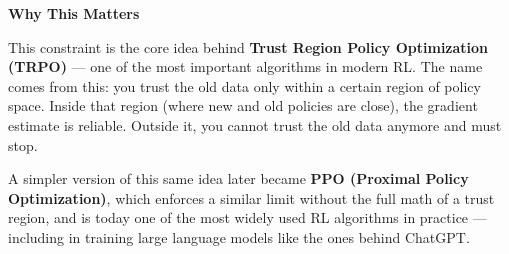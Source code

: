 \textbf{Why This Matters}

This constraint is the core idea behind \textbf{Trust Region Policy Optimization (TRPO)} --- one
of the most important algorithms in modern RL. The name comes from this: you trust the old data
only within a certain region of policy space. Inside that region (where new and old policies are
close), the gradient estimate is reliable. Outside it, you cannot trust the old data anymore and
must stop.

A simpler version of this same idea later became \textbf{PPO (Proximal Policy Optimization)},
which enforces a similar limit without the full math of a trust region, and is today one of the
most widely used RL algorithms in practice --- including in training large language models like the
ones behind ChatGPT.